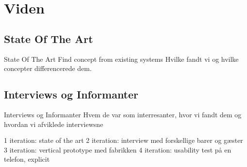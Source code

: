 \section{Viden}

\subsection{State Of The Art}
\begin{frame}{State Of The Art}
	Find concept from existing systems
	Hvilke fandt vi og hvilke concepter differencerede dem.
\end{frame}
\subsection{Interviews og Informanter}
\begin{frame}{Interviews og Informanter}
	Hvem de var som interresanter, hvor vi fandt dem og hvordan vi afviklede interviewsne

	1 iteration: state of the art
	2 iteration: interview med forskellige barer og gæster
	3 iteration: vertical prototype med fabrikken
	4 iteration: usability test på en telefon, explicit
\end{frame}
